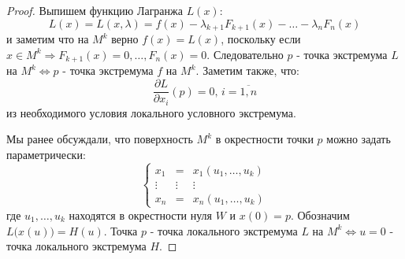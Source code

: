 \documentclass[12pt]{article}
\theoremstyle{definition}
\begin{document}
\begin{proof}
	Выпишем функцию Лагранжа $L(x)$:
	$$
		L(x) = L(x,\lambda) =f(x) - \lambda_{k+1} F_{k+1}(x) - \dotsc - \lambda_n F_n(x)
	$$
	и заметим что на $M^k$ верно $f(x) = L(x)$, поскольку если $x \in M^k \Rightarrow F_{k+1}(x) = 0, \dotsc, F_n(x) = 0$. Следовательно $p$ - точка экстремума $L$ на $M^k \Leftrightarrow p$ - точка экстремума $f$ на $M^k$. Заметим также, что:
	$$
		\dfrac{\partial L}{\partial x_i}(p) = 0, \, i = \overline{1,n}
	$$
	из необходимого условия локального условного экстремума.
	
	Мы ранее обсуждали, что поверхность $M^k$ в окрестности точки $p$ можно задать параметрически:
	$$
		\left\{
			\begin{array}{ccc}
				x_1& = &x_1(u_1,\dotsc, u_k) \\
				\vdots & \vdots & \vdots \\
				x_n& = &x_n(u_1,\dotsc, u_k)
			\end{array}
		\right.
	$$
	где $u_1,\dotsc, u_k$ находятся в окрестности нуля $W$ и $x(0) = p$. Обозначим $L\big(x(u)\big) = H(u)$. Точка $p$ - точка локального экстремума $L$ на $M^k \Leftrightarrow u = 0$ - точка локального экстремума $H$.
	

\end{proof}
\end{document}
